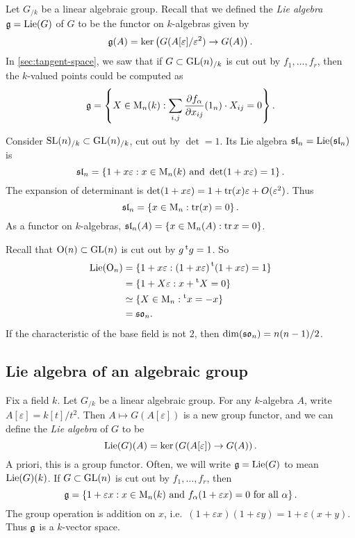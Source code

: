 Let $G_{/k}$ be a linear algebraic group. Recall that we defined the \emph{Lie 
algebra} $\mathfrak{g}=\operatorname{Lie}(G)$ of $G$ to be the functor on $k$-algebras given by 
\[
  \mathfrak{g}(A) = \ker\left(G(A[\varepsilon]/\varepsilon^2) \to G(A)\right) .
\]
In \autoref{sec:tangent-space}, we saw that if $G\subset \operatorname{GL}(n)_{/k}$ is cut out by 
$f_1,\dots,f_r$, then the $k$-valued points could be computed as 
\[
  \mathfrak{g} = \left\{X\in \operatorname{M}_n(k):\sum_{i,j} \frac{\partial f_\alpha}{\partial x_{i j}}(1_n)\cdot X_{i j}=0\right\} .
\]

\begin{example}
Consider $\operatorname{SL}(n)_{/k}\subset \operatorname{GL}(n)_{/k}$, cut out by $\det=1$. Its Lie algebra  
$\mathfrak{sl}_n=\operatorname{Lie}(\mathfrak{sl}_n)$ is 
\[
  \mathfrak{sl}_n = \left\{1+x\varepsilon:x\in \operatorname{M}_n(k)\text{ and }\det(1+x\varepsilon)=1\right\} .
\]
The expansion of determinant is 
$\det(1+x\varepsilon)=1+\operatorname{tr}(x)\varepsilon + O(\varepsilon^2)$. Thus 
\[
  \mathfrak{sl}_n = \left\{x\in \operatorname{M}_n :\operatorname{tr}(x)=0\right\} .
\]
As a functor on $k$-algebras, $\mathfrak{sl}_n(A)=\{x\in \operatorname{M}_n(A):\operatorname{tr} x=0\}$. 
\end{example}

\begin{example}[Orthogonal]
Recall that $\operatorname{O}(n)\subset \operatorname{GL}(n)$ is cut out by $g \prescript{\mathrm{t}}{}{g}=1$. So 
\begin{align*}
  \operatorname{Lie}(\operatorname{O}_n)
    &= \{1+x\varepsilon : (1+x\varepsilon) \prescript{\mathrm{t}}{}{(1+x\varepsilon)}=1\} \\
    &= \{1+X\varepsilon:x+\prescript{\mathrm{t}}{}{X}=0\} \\
    &\simeq \{X\in \operatorname{M}_n :\prescript{\mathrm{t}}{}{x}=-x\} \\
    &= \mathfrak{so}_n .
\end{align*}
If the characteristic of the base field is not $2$, then 
$\dim(\mathfrak{so}_n)=n(n-1)/2$. 
\end{example}





\subsection{Lie algebra of an algebraic group}\label{sec:lie-alg-of-group}

Fix a field $k$. Let $G_{/k}$ be a linear algebraic group. For any $k$-algebra 
$A$, write $A[\varepsilon]=k[t]/t^2$. Then $A\mapsto G(A[\varepsilon])$ is a 
new group functor, and we can define the \emph{Lie algebra} of $G$ to be 
\[
  \operatorname{Lie}(G)(A) = \ker\left(G(A[\varepsilon]) \to G(A)\right) .
\]
A priori, this is a group functor. Often, we will write $\mathfrak{g}=\operatorname{Lie}(G)$ to mean 
$\operatorname{Lie}(G)(k)$. If $G\subset \operatorname{GL}(n)$ is cut out by $f_1,\dots,f_r$, then 
\[
  \mathfrak{g}=\left\{1+\varepsilon x:x\in \operatorname{M}_n(k)\text{ and }f_\alpha(1+\varepsilon x)=0\text{ for all }\alpha\right\} .
\]
The group operation is addition on $x$, 
i.e.~$(1+\varepsilon x)(1+\varepsilon y)=1+\varepsilon(x+y)$. Thus 
$\mathfrak{g}$ is a $k$-vector space. 

